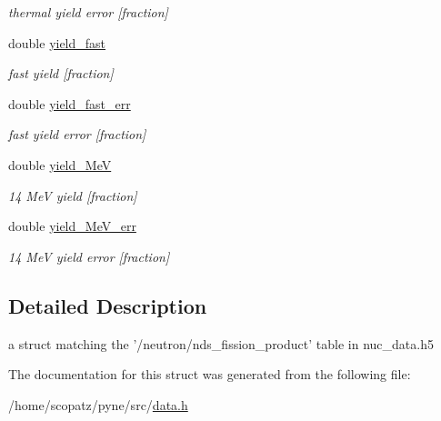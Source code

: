\begin{DoxyCompactItemize}
\begin{DoxyCompactList}\small\item\em thermal yield error \mbox{[}fraction\mbox{]} \end{DoxyCompactList}\item 
\hypertarget{structpyne_1_1ndsfpy_ae890b10d182d771d0837b24818040a25}{double \hyperlink{structpyne_1_1ndsfpy_ae890b10d182d771d0837b24818040a25}{yield\-\_\-fast}}\label{structpyne_1_1ndsfpy_ae890b10d182d771d0837b24818040a25}

\begin{DoxyCompactList}\small\item\em fast yield \mbox{[}fraction\mbox{]} \end{DoxyCompactList}\item 
\hypertarget{structpyne_1_1ndsfpy_a0e2478bc6cbf2317861727a88cb8370b}{double \hyperlink{structpyne_1_1ndsfpy_a0e2478bc6cbf2317861727a88cb8370b}{yield\-\_\-fast\-\_\-err}}\label{structpyne_1_1ndsfpy_a0e2478bc6cbf2317861727a88cb8370b}

\begin{DoxyCompactList}\small\item\em fast yield error \mbox{[}fraction\mbox{]} \end{DoxyCompactList}\item 
\hypertarget{structpyne_1_1ndsfpy_a5e67e99b97b5ca511ca39c6dcd4b186e}{double \hyperlink{structpyne_1_1ndsfpy_a5e67e99b97b5ca511ca39c6dcd4b186e}{yield\-\_\-Me\-V}}\label{structpyne_1_1ndsfpy_a5e67e99b97b5ca511ca39c6dcd4b186e}

\begin{DoxyCompactList}\small\item\em 14 Me\-V yield \mbox{[}fraction\mbox{]} \end{DoxyCompactList}\item 
\hypertarget{structpyne_1_1ndsfpy_a1d24f4162fe242108b8032f76171d7e5}{double \hyperlink{structpyne_1_1ndsfpy_a1d24f4162fe242108b8032f76171d7e5}{yield\-\_\-Me\-V\-\_\-err}}\label{structpyne_1_1ndsfpy_a1d24f4162fe242108b8032f76171d7e5}

\begin{DoxyCompactList}\small\item\em 14 Me\-V yield error \mbox{[}fraction\mbox{]} \end{DoxyCompactList}\end{DoxyCompactItemize}


\subsection{Detailed Description}
a struct matching the '/neutron/nds\-\_\-fission\-\_\-product' table in nuc\-\_\-data.\-h5 

The documentation for this struct was generated from the following file\-:\begin{DoxyCompactItemize}
\item 
/home/scopatz/pyne/src/\hyperlink{data_8h}{data.\-h}\end{DoxyCompactItemize}
